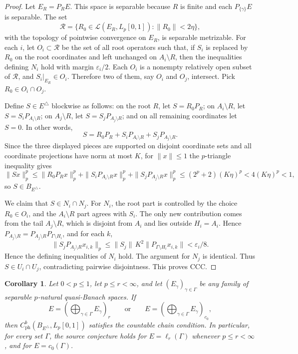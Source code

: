\documentclass[11pt]{article}
\newtheorem{corollary}{Corollary}
\newcommand{\Lp}{L_p[0,1]}
\newcommand{\ph}{\mathrm{ph}}
\begin{document}
\begin{proof}
Let \(E_R=P_RE\).  This space is separable because \(R\) is finite and each
\(P_{\{\gamma\}}E\) is separable.
The set
\[
  \mathcal R=\{R_0\in\mathcal L(E_R,\Lp):\|R_0\|<2\eta\},
\]
with the topology of pointwise convergence on \(E_R\), is separable metrizable.
For each \(i\), let \(O_i\subset\mathcal R\) be the set of all root operators
such that, if \(S_i\) is replaced by \(R_0\) on the root coordinates and left
unchanged on \(A_i\setminus R\), then the inequalities defining \(N_i\) hold
with margin \(\varepsilon_i/2\).  Each \(O_i\) is a nonempty relatively open
subset of \(\mathcal R\), and \(S_i|_{E_R}\in O_i\).  Therefore two of them,
say \(O_i\) and \(O_j\), intersect.  Pick \(R_0\in O_i\cap O_j\).

Define \(S\in E^\triangle\) blockwise as follows: on the root \(R\), let
\(S=R_0P_R\); on \(A_i\setminus R\), let \(S=S_iP_{A_i\setminus R}\); on
\(A_j\setminus R\), let \(S=S_jP_{A_j\setminus R}\); and on all remaining
coordinates let \(S=0\).  In other words,
\[
  S=R_0P_R+S_iP_{A_i\setminus R}+S_jP_{A_j\setminus R}.
\]
Since the three displayed pieces are supported on disjoint coordinate sets and
all coordinate projections have norm at most \(K\), for \(\|x\|\leq1\) the
\(p\)-triangle inequality gives
\[
  \|Sx\|_p^p
  \leq \|R_0P_Rx\|_p^p
     + \|S_iP_{A_i\setminus R}x\|_p^p
     + \|S_jP_{A_j\setminus R}x\|_p^p
  \leq (2^p+2)(K\eta)^p
  <4(K\eta)^p<1,
\]
so \(S\in B_{E^\triangle}\).

We claim that \(S\in N_i\cap N_j\).  For \(N_i\), the root part is controlled
by the choice \(R_0\in O_i\), and the \(A_i\setminus R\) part agrees with
\(S_i\).  The only new contribution comes from the tail \(A_j\setminus R\),
which is disjoint from \(A_i\) and lies outside \(H_i=A_i\).  Hence
\(P_{A_j\setminus R}=P_{A_j\setminus R}P_{\Gamma\setminus H_i}\), and for
each \(k\),
\[
  \|S_j P_{A_j\setminus R}x_{i,k}\|_p
  \leq \|S_j\|\,K^2\|P_{\Gamma\setminus H_i}x_{i,k}\|
  <\varepsilon_i/8.
\]
Hence the defining inequalities of \(N_i\) hold.  The argument for \(N_j\) is
identical.  Thus \(S\in U_i\cap U_j\), contradicting pairwise disjointness.
This proves CCC.
\end{proof}

\begin{corollary}
Let \(0<p\leq1\), let \(p\leq r<\infty\), and let
\((E_\gamma)_{\gamma\in\Gamma}\) be any family of separable \(p\)-natural
quasi-Banach spaces.  If
\[
  E=\left(\bigoplus_{\gamma\in\Gamma}E_\gamma\right)_r
  \qquad\text{or}\qquad
  E=\left(\bigoplus_{\gamma\in\Gamma}E_\gamma\right)_{c_0},
\]
then \(C_{\ph}^b(B_{E^\triangle},\Lp)\) satisfies the countable chain
condition.  In particular, for every set \(\Gamma\), the source conjecture
holds for \(E=\ell_r(\Gamma)\) whenever \(p\leq r<\infty\), and for
\(E=c_0(\Gamma)\).
\end{corollary}
\end{document}
